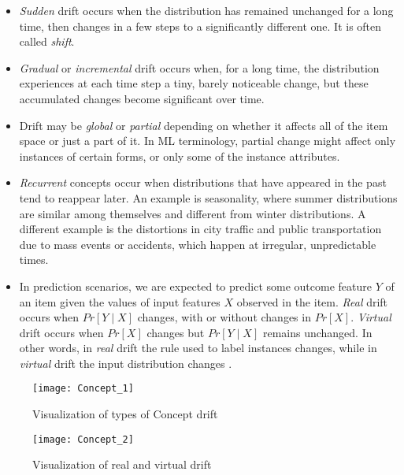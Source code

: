 \documentclass[12pt,oneside,a4paper,parskip]{scrbook}
\begin{document}
\begin{itemize}
  \item \textit{Sudden} drift occurs when the distribution has remained unchanged for a long time, then changes in a few steps to a significantly different one. It is often called \textit{shift}.
  \item \textit{Gradual} or \textit{incremental} drift occurs when, for a long time, the distribution experiences at each time step a tiny, barely noticeable change, but these accumulated changes become significant over time.
  \item Drift may be \textit{global} or \textit{partial} depending on whether it affects all of the item space or just a part of it. In ML terminology, partial change might affect only instances of certain forms, or only some of the instance attributes.
  \item \textit{Recurrent} concepts occur when distributions that have appeared in the past tend to reappear later. An example is seasonality, where summer distributions are similar among themselves and different from winter distributions. A different example is the distortions in city traffic and public transportation due to mass events or accidents, which happen at irregular, unpredictable times.
  \item In prediction scenarios, we are expected to predict some outcome feature $Y$ of an item given the values of input features $X$ observed in the item. \textit{Real} drift occurs when $Pr[Y\mid X]$ changes, with or without changes in $Pr[X]$. \textit{Virtual} drift occurs when $Pr[X]$ changes but $Pr[Y\mid X]$ remains unchanged. In other words, in \textit{real} drift the rule used to label instances changes, while in \textit{virtual} drift the input distribution changes \cite{MLonDataStreams}.
\end{itemize}

\begin{figure}[H]
  \centering
  \texttt{[image: Concept\_1]}
  \caption{Visualization of types of Concept drift \cite{ConceptDrift}} 
  \label{fig:concept_1}
\end{figure}

\begin{figure}[H]
  \centering
  \texttt{[image: Concept\_2]}
  \caption{Visualization of real and virtual drift \cite{ConceptDrift}} 
  \label{fig:concept_2}
\end{figure}

\cite{ConceptDrift}
\end{document}
